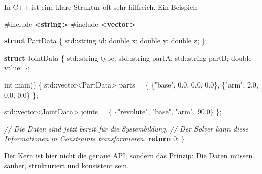 \documentclass[
  12pt
]{book}
\newenvironment{Shaded}{}{}
\newcommand{\BuiltInTok}[1]{\textcolor[rgb]{0.00,0.50,0.00}{#1}}
\newcommand{\CommentTok}[1]{\textcolor[rgb]{0.38,0.63,0.69}{\textit{#1}}}
\newcommand{\ControlFlowTok}[1]{\textcolor[rgb]{0.00,0.44,0.13}{\textbf{#1}}}
\newcommand{\DataTypeTok}[1]{\textcolor[rgb]{0.56,0.13,0.00}{#1}}
\newcommand{\DecValTok}[1]{\textcolor[rgb]{0.25,0.63,0.44}{#1}}
\newcommand{\FloatTok}[1]{\textcolor[rgb]{0.25,0.63,0.44}{#1}}
\newcommand{\ImportTok}[1]{\textcolor[rgb]{0.00,0.50,0.00}{\textbf{#1}}}
\newcommand{\KeywordTok}[1]{\textcolor[rgb]{0.00,0.44,0.13}{\textbf{#1}}}
\newcommand{\NormalTok}[1]{#1}
\newcommand{\OperatorTok}[1]{\textcolor[rgb]{0.40,0.40,0.40}{#1}}
\newcommand{\PreprocessorTok}[1]{\textcolor[rgb]{0.74,0.48,0.00}{#1}}
\newcommand{\StringTok}[1]{\textcolor[rgb]{0.25,0.44,0.63}{#1}}
\begin{document}
In C++ ist eine klare Struktur oft sehr hilfreich. Ein Beispiel:

\begin{Shaded}
\begin{Highlighting}[]
\PreprocessorTok{\#include }\ImportTok{\textless{}string\textgreater{}}
\PreprocessorTok{\#include }\ImportTok{\textless{}vector\textgreater{}}

\KeywordTok{struct}\NormalTok{ PartData }\OperatorTok{\{}
    \BuiltInTok{std::}\NormalTok{string id}\OperatorTok{;}
    \DataTypeTok{double}\NormalTok{ x}\OperatorTok{;}
    \DataTypeTok{double}\NormalTok{ y}\OperatorTok{;}
    \DataTypeTok{double}\NormalTok{ z}\OperatorTok{;}
\OperatorTok{\};}

\KeywordTok{struct}\NormalTok{ JointData }\OperatorTok{\{}
    \BuiltInTok{std::}\NormalTok{string type}\OperatorTok{;}
    \BuiltInTok{std::}\NormalTok{string partA}\OperatorTok{;}
    \BuiltInTok{std::}\NormalTok{string partB}\OperatorTok{;}
    \DataTypeTok{double}\NormalTok{ value}\OperatorTok{;}
\OperatorTok{\};}

\DataTypeTok{int}\NormalTok{ main}\OperatorTok{()} \OperatorTok{\{}
    \BuiltInTok{std::}\NormalTok{vector}\OperatorTok{\textless{}}\NormalTok{PartData}\OperatorTok{\textgreater{}}\NormalTok{ parts }\OperatorTok{=} \OperatorTok{\{}
        \OperatorTok{\{}\StringTok{"base"}\OperatorTok{,} \FloatTok{0.0}\OperatorTok{,} \FloatTok{0.0}\OperatorTok{,} \FloatTok{0.0}\OperatorTok{\},}
        \OperatorTok{\{}\StringTok{"arm"}\OperatorTok{,} \FloatTok{2.0}\OperatorTok{,} \FloatTok{0.0}\OperatorTok{,} \FloatTok{0.0}\OperatorTok{\}}
    \OperatorTok{\};}

    \BuiltInTok{std::}\NormalTok{vector}\OperatorTok{\textless{}}\NormalTok{JointData}\OperatorTok{\textgreater{}}\NormalTok{ joints }\OperatorTok{=} \OperatorTok{\{}
        \OperatorTok{\{}\StringTok{"revolute"}\OperatorTok{,} \StringTok{"base"}\OperatorTok{,} \StringTok{"arm"}\OperatorTok{,} \FloatTok{90.0}\OperatorTok{\}}
    \OperatorTok{\};}

    \CommentTok{// Die Daten sind jetzt bereit für die Systembildung.}
    \CommentTok{// Der Solver kann diese Informationen in Constraints transformieren.}
    \ControlFlowTok{return} \DecValTok{0}\OperatorTok{;}
\OperatorTok{\}}
\end{Highlighting}
\end{Shaded}

Der Kern ist hier nicht die genaue API, sondern das Prinzip: Die Daten
müssen sauber, strukturiert und konsistent sein.
\end{document}
